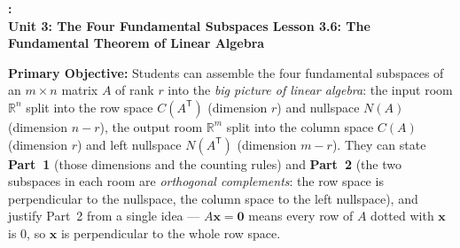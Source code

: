 \documentclass[10pt]{article}
\newcommand{\xx}{\mathbf{x}}
\newcommand{\zero}{\mathbf{0}}
\newcommand{\T}{\mathsf{T}}
\newcommand{\UnitNumberName}{Unit 3: The Four Fundamental Subspaces \quad}
\newcommand{\LessonNumberName}{Lesson 3.6: The Fundamental Theorem of Linear Algebra}
\begin{document}
\begin{center}
    {\Large\bfseries \CourseName: \SchoolYear \\
    {\small\bfseries \UnitNumberName \LessonNumberName}}
\end{center}

\begin{tcolorbox}[colback=blush, colframe=burgundy, boxrule=0.9pt, arc=2mm,
    left=2mm, right=2mm, top=1.5mm, bottom=1.5mm]
    \textbf{Primary Objective:} Students can assemble the four fundamental subspaces of an $m\times n$ matrix
    $A$ of rank $r$ into the \emph{big picture of linear algebra}: the input room $\mathbb{R}^n$ split into
    the row space $C(A^{\T})$ (dimension $r$) and nullspace $N(A)$ (dimension $n-r$), the output room
    $\mathbb{R}^m$ split into the column space $C(A)$ (dimension $r$) and left nullspace $N(A^{\T})$
    (dimension $m-r$). They can state \textbf{Part~1} (those dimensions and the counting rules) and
    \textbf{Part~2} (the two subspaces in each room are \emph{orthogonal complements}: the row space is
    perpendicular to the nullspace, the column space to the left nullspace), and justify Part~2 from a single
    idea --- $A\xx=\zero$ means every row of $A$ dotted with $\xx$ is $0$, so $\xx$ is perpendicular to the
    whole row space.
\end{tcolorbox}
\end{document}
